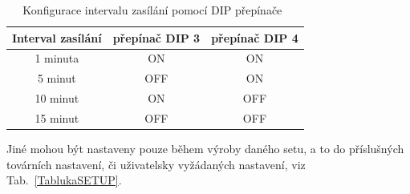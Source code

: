 \newpage{}

\begin{table}[!ht]
\centering
\caption{Konfigurace intervalu zasílání pomocí DIP přepínače~\cite{CidloWeptech}}
\label{TablukaDIP}
\begin{tabular}{|c|c|c|}
\hline
\textbf{Interval zasílání} & přepínač DIP 3 & přepínač DIP 4 \\ \hline \hline
1 minuta & ON & ON \\ \hline
5 minut & OFF & ON \\ \hline
10 minut & ON & OFF \\ \hline
15 minut & OFF & OFF \\ \hline \hline
\end{tabular}
\end{table}

Jiné mohou být nastaveny pouze během výroby daného setu, a to do příslušných továrních nastavení, či uživatelsky vyžádaných nastavení, viz Tab.~\ref{TablukaSETUP}.

